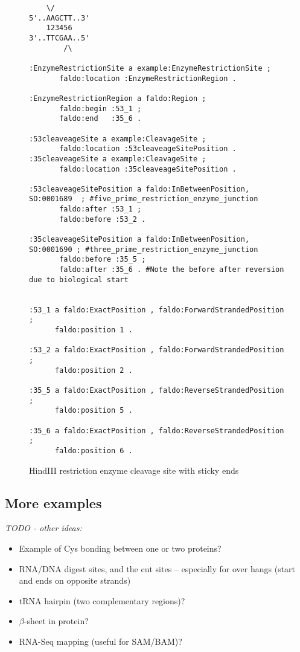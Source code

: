 \begin{figure}
\begin{framed}
\small
\begin{verbatim}
    \/
5'..AAGCTT..3' 
    123456
3'..TTCGAA..5'
        /\
        
:EnzymeRestrictionSite a example:EnzymeRestrictionSite ;
       faldo:location :EnzymeRestrictionRegion .
       
:EnzymeRestrictionRegion a faldo:Region ;
       faldo:begin :53_1 ;
       faldo:end   :35_6 .
       
:53cleaveageSite a example:CleavageSite ;
       faldo:location :53cleaveageSitePosition .
:35cleaveageSite a example:CleavageSite ;
       faldo:location :35cleaveageSitePosition .
        
:53cleaveageSitePosition a faldo:InBetweenPosition, SO:0001689  ; #five_prime_restriction_enzyme_junction 
       faldo:after :53_1 ;        
       faldo:before :53_2 .
       
:35cleaveageSitePosition a faldo:InBetweenPosition, SO:0001690 ; #three_prime_restriction_enzyme_junction 
       faldo:before :35_5 ;
       faldo:after :35_6 . #Note the before after reversion due to biological start      

       
:53_1 a faldo:ExactPosition , faldo:ForwardStrandedPosition ;
      faldo:position 1 .

:53_2 a faldo:ExactPosition , faldo:ForwardStrandedPosition ;
      faldo:position 2 .

:35_5 a faldo:ExactPosition , faldo:ReverseStrandedPosition ;
      faldo:position 5 .

:35_6 a faldo:ExactPosition , faldo:ReverseStrandedPosition ;
      faldo:position 6 .
\end{verbatim}
\end{framed}
\caption{HindIII restriction enzyme cleavage site with sticky ends}
\label{fig:HindIII}
\end{figure}

\subsection*{More examples}

\textit{TODO - other ideas:}
\begin{itemize}
\item Example of Cys bonding between one or two proteins?
\item RNA/DNA digest sites, and the cut sites -- especially for over hangs (start and ends on opposite strands)
\item tRNA hairpin (two complementary regions)?
\item $\beta$-sheet in protein?
\item RNA-Seq mapping (useful for SAM/BAM)?
\end{itemize}
